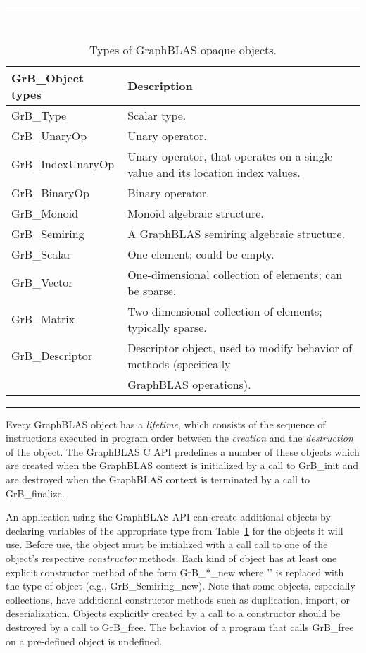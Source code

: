 \begin{table}
\hrule
\begin{center}
\caption{Types of GraphBLAS opaque objects.}
\label{Tab:ObjTypes}
~\\
\begin{tabular}{l|l}
{\sf GrB\_Object types} & Description \\
\hline
{\sf GrB\_Type}           & Scalar type.     \\ \hline
{\sf GrB\_UnaryOp}        & Unary operator.     \\
{\sf GrB\_IndexUnaryOp}   & Unary operator, that operates on a single value and its location index values.     \\
{\sf GrB\_BinaryOp}       & Binary operator.     \\
{\sf GrB\_Monoid}         & Monoid algebraic structure.     \\
{\sf GrB\_Semiring}       & A GraphBLAS semiring algebraic structure. \\ \hline
{\sf GrB\_Scalar}         & One element; could be empty. \\ 
{\sf GrB\_Vector}         & One-dimensional collection of elements; can be sparse.     \\
{\sf GrB\_Matrix}         & Two-dimensional collection of elements; typically sparse.    \\ \hline
{\sf GrB\_Descriptor}     & Descriptor object, used to modify behavior of methods (specifically \\
                          & GraphBLAS operations).     \\
\end{tabular}
\end{center}
\hrule
\end{table}

Every GraphBLAS object has a \emph{lifetime}, which consists of
the sequence of instructions executed in program order between the
\emph{creation} and the \emph{destruction} of the object.  The GraphBLAS C
API predefines a number of these objects which are created
when the GraphBLAS context is initialized by a call to {\sf GrB\_init}
and are destroyed when the GraphBLAS context is terminated by a call to
{\sf GrB\_finalize}.

An application using the GraphBLAS API can create additional objects by
declaring variables of the appropriate type from Table~\ref{Tab:ObjTypes} for 
the objects it will use.  Before use, the object must be initialized 
with a call call to one of the object's respective \emph{constructor} methods.  
Each kind of object has at least one explicit constructor method of the form 
{\sf GrB\_*\_new} where '{\sf *}' is replaced with the type of object (e.g., 
{\sf GrB\_Semiring\_new}). Note that some objects, especially collections, 
have additional constructor methods such as duplication, import, or 
deserialization.  Objects explicitly created by a call to a constructor 
should be destroyed by a call to {\sf GrB\_free}. The behavior of a program
that calls {\sf GrB\_free} on a pre-defined object is undefined.

